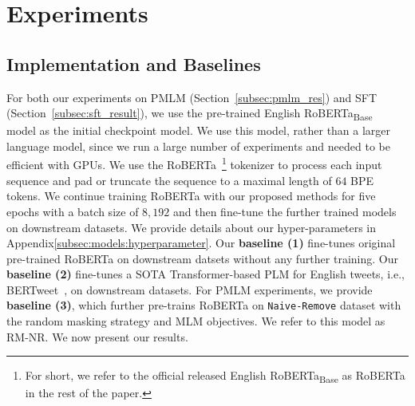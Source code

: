 \section{Experiments}\label{sec:experiment}



\subsection{Implementation and Baselines}\label{subsec:baseline} 
For both our experiments on PMLM (Section~\ref{subsec:pmlm_res}) and SFT (Section~\ref{subsec:sft_result}), we use the pre-trained English RoBERTa\textsubscript{Base}~\cite{liu2019roberta} model as the initial checkpoint model. We use this model, rather than a larger language model, since we run a large number of experiments and needed to be efficient with GPUs. We use the RoBERTa~\footnote{For short, we refer to the official released English RoBERTa\textsubscript{Base} as RoBERTa in the rest of the paper.} tokenizer to process each input sequence and pad or truncate the sequence to a maximal length of $64$ BPE tokens. We continue training RoBERTa with our proposed methods for five epochs with a batch size of $8,192$ and then fine-tune the further trained models on downstream datasets. We provide details about our hyper-parameters in Appendix\ref{subsec:models:hyperparameter}. Our \textbf{baseline (1)} fine-tunes original pre-trained RoBERTa on downstream datsets without any further training. %
Our \textbf{baseline (2)} fine-tunes a SOTA Transformer-based PLM for English tweets, i.e., BERTweet~\cite{nguyen-etal-2020-bertweet}, on downstream datasets. For PMLM experiments, we provide \textbf{baseline (3)}, which further pre-trains RoBERTa on \texttt{Naive-Remove} dataset with the random masking strategy and MLM objectives. We refer to this model as RM-NR. We now present our results.


